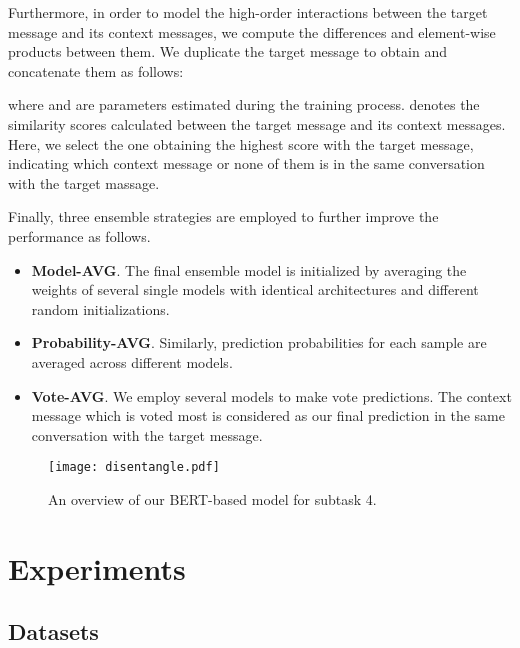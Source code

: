 \documentclass[letterpaper]{article} \usepackage{aaai20}  \usepackage{times}  \usepackage{helvet} \usepackage{courier}  \usepackage[hyphens]{url}  \usepackage{graphicx} \urlstyle{rm} \def\UrlFont{\rm}  \usepackage{graphicx}  \frenchspacing  \setlength{\pdfpagewidth}{8.5in}  \setlength{\pdfpageheight}{11in}
\begin{document}
    Furthermore, in order to model the high-order interactions between the target message and its context messages, we compute the differences and element-wise products between them.
    We duplicate the target message to obtain  and concatenate them as follows:
    
    where  and  are parameters estimated during the training process.
     denotes the similarity scores calculated between the target message and its context messages.
    Here, we select the one obtaining the highest score with the target message, indicating which context message or none of them is in the same conversation with the target massage.

    Finally, three ensemble strategies are employed to further improve the performance as follows.
    \begin{itemize}
      \item \textbf{Model-AVG}. The final ensemble model is initialized by averaging the weights of several single models with identical architectures and different random initializations.
      \item \textbf{Probability-AVG}. Similarly, prediction probabilities for each sample are averaged across different models.
      \item \textbf{Vote-AVG}. We employ several models to make vote predictions. The context message which is voted most is considered as our final prediction in the same conversation with the target message.
    \end{itemize}



    \begin{figure}
      \texttt{[image: disentangle.pdf]}
      \caption{An overview of our BERT-based model for subtask 4.}
      \label{fig3}
    \end{figure}


\section{Experiments}

  \subsection{Datasets}
\end{document}
